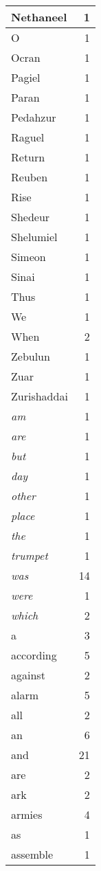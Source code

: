 \begin{center}
\begin{longtable}{l|r}
Nethaneel & 1 \\ \hline
O & 1 \\ \hline
Ocran & 1 \\ \hline
Pagiel & 1 \\ \hline
Paran & 1 \\ \hline
Pedahzur & 1 \\ \hline
Raguel & 1 \\ \hline
Return & 1 \\ \hline
Reuben & 1 \\ \hline
Rise & 1 \\ \hline
Shedeur & 1 \\ \hline
Shelumiel & 1 \\ \hline
Simeon & 1 \\ \hline
Sinai & 1 \\ \hline
Thus & 1 \\ \hline
We & 1 \\ \hline
When & 2 \\ \hline
Zebulun & 1 \\ \hline
Zuar & 1 \\ \hline
Zurishaddai & 1 \\ \hline
\emph{am} & 1 \\ \hline
\emph{are} & 1 \\ \hline
\emph{but} & 1 \\ \hline
\emph{day} & 1 \\ \hline
\emph{other} & 1 \\ \hline
\emph{place} & 1 \\ \hline
\emph{the} & 1 \\ \hline
\emph{trumpet} & 1 \\ \hline
\emph{was} & 14 \\ \hline
\emph{were} & 1 \\ \hline
\emph{which} & 2 \\ \hline
a & 3 \\ \hline
according & 5 \\ \hline
against & 2 \\ \hline
alarm & 5 \\ \hline
all & 2 \\ \hline
an & 6 \\ \hline
and & 21 \\ \hline
are & 2 \\ \hline
ark & 2 \\ \hline
armies & 4 \\ \hline
as & 1 \\ \hline
assemble & 1 \\ \hline

\end{longtable}
\end{center}
